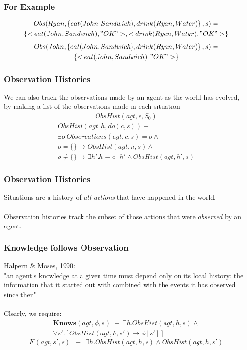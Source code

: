 \documentclass{beamer}
\begin{document}
\begin{frame}
\frametitle{For Example}
\begin{multline*}
  Obs(Ryan,\left\{eat(John,Sandwich),drink(Ryan,Water)\right\},s) = \\
     \left\{<eat(John,Sandwich),"OK">,<drink(Ryan,Water),"OK">\right\}
\end{multline*}
\pause
\begin{multline*}
  Obs(John,\left\{eat(John,Sandwich),drink(Ryan,Water)\right\},s) = \\
     \left\{<eat(John,Sandwich),"OK">\right\}
\end{multline*}
\end{frame}

\begin{frame}
\frametitle{Observation Histories}
We can also track the observations made by an agent as the world has evolved,
by making a list of the observations made in each situation:
\begin{multline*}
ObsHist(agt,\epsilon,S_0)
\end{multline*}
\begin{multline*}
ObsHist(agt,h,do(c,s)) \equiv \\
    \exists o . Observations(agt,c,s) = o \wedge \\
    o = \{\} \rightarrow ObsHist(agt,h,s) \wedge \\
    o \not = \{\} \rightarrow \exists h' . h=o\cdot h' \wedge ObsHist(agt,h',s)
\end{multline*}
\end{frame}

\begin{frame}
\frametitle{Observation Histories}
Situations are a history of \emph{all actions} that have happened in the world.
\ \\
\ \\
Observation histories track the subset of those actions that were
\emph{observed} by an agent.
\end{frame}

\begin{frame}
\frametitle{Knowledge follows  Observation}
Halpern \& Moses, 1990:\\
"an agent's knowledge at a given time must depend only on its local history:
the information that it started out with combined with the events it has
observed since then"
\pause
\ \\
\ \\
Clearly, we require:
\begin{multline*}
\mathbf{Knows}(agt,\phi,s)\ \equiv\ \exists h . ObsHist(agt,h,s) \wedge \\
    \forall s' . \left[ObsHist(agt,h,s') \rightarrow \phi[s']\right]
\end{multline*}
\pause
\begin{equation*}
K(agt,s',s)\ \ \equiv\ \ \exists h . ObsHist(agt,h,s) \wedge ObsHist(agt,h,s')
\end{equation*}
\end{frame}
\end{document}
